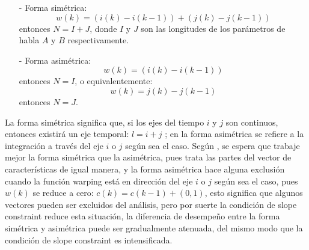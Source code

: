 \begin{enumerate}
\begin{enumerate}
\begin{enumerate}
\item[-]Forma simétrica:
\begin{equation}
\label{eq:ecuacion89}
w(k) = (i(k) - i(k - 1)) + (j(k) - j(k - 1))
\end{equation}
entonces $N = I + J$, donde $I$ y $J$ son las longitudes de los parámetros de habla $A$ y $B$ respectivamente.
\item[-]Forma asimétrica:
\begin{equation}
\label{eq:ecuacion90}
w(k) = (i(k) - i(k-1))
\end{equation}
entonces $N = I$, o equivalentemente:
\begin{equation}
\label{eq:ecuacion91}
w(k) = j(k) - j(k - 1)
\end{equation}
entonces $N = J$.
\end{enumerate}

La forma simétrica significa que, si los ejes del tiempo $i$ y $j$ son continuos, entonces existirá un eje temporal: $l = i + j$ ; en la forma asimétrica se refiere a la integración a través del eje $i$ o $j$ según sea el caso. Según \citep{sakoe}, se espera que trabaje mejor la forma simétrica que la asimétrica, pues trata las partes del vector de características de igual manera, y la forma asimétrica hace alguna exclusión cuando la función warping está en dirección del eje $i$ o $j$ según sea el caso, pues $w(k)$ se reduce a cero: $c(k) = c(k-1)+(0,1)$, esto significa que algunos vectores pueden ser excluidos del análisis, pero por suerte la condición de slope constraint reduce esta situación, la diferencia de desempeño entre la forma simétrica y asimétrica puede ser gradualmente atenuada, del mismo modo que la condición de slope constraint es intensificada.


\end{enumerate}
\end{enumerate}
